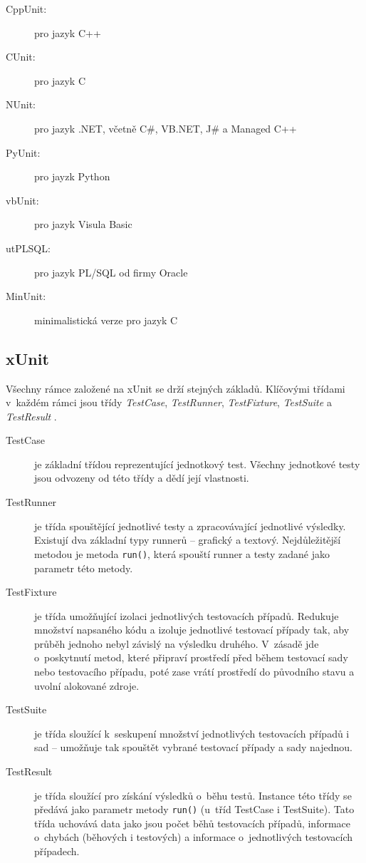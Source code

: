   \begin{description}
   \item[CppUnit:] pro jazyk C++
   \item[CUnit:] pro jazyk C
   \item[NUnit:] pro jazyk .NET, včetně C\#, VB.NET, J\# a Managed C++
   \item[PyUnit:] pro jayzk Python
   \item[vbUnit:] pro jazyk Visula Basic
   \item[utPLSQL:] pro jazyk PL/SQL od firmy Oracle
   \item[MinUnit:] minimalistická verze pro jazyk C
  \end{description}


    \subsection{xUnit}
    Všechny rámce založené na xUnit se drží stejných základů. Klíčovými třídami v~každém rámci jsou třídy \emph{TestCase}, \emph{TestRunner}, \emph{TestFixture}, \emph{TestSuite} a \emph{TestResult} \cite{UnitTestFrameworks}.

    \begin{description}
      \item[TestCase] je základní třídou reprezentující jednotkový test. Všechny jednotkové testy jsou odvozeny od této třídy a dědí její vlastnosti.
      \item[TestRunner] je třída spouštějící jednotlivé testy a zpracovávající jednotlivé výsledky. Existují dva základní typy runnerů -- grafický a textový. Nejdůležitější metodou je metoda \texttt{run()}, která spouští runner a testy zadané jako parametr této metody.
      \item[TestFixture] je třída umožňující izolaci jednotlivých testovacích případů. Redukuje množství napsaného kódu a izoluje jednotlivé testovací případy tak, aby průběh jednoho nebyl závislý na výsledku druhého. V~zásadě jde o~poskytnutí metod, které připraví prostředí před během testovací sady nebo testovacího případu, poté zase vrátí prostředí do původního stavu a uvolní alokované zdroje.
      \item[TestSuite] je třída sloužící k~seskupení množství jednotlivých testovacích případů i sad -- umožňuje tak spouštět vybrané testovací případy a sady najednou.
      \item[TestResult] je třída sloužící pro získání výsledků o~běhu testů. Instance této třídy se předává jako parametr metody \texttt{run()} (u~tříd TestCase i TestSuite). Tato třída uchovává data jako jsou počet běhů testovacích případů, informace o~chybách (běhových i testových) a informace o~jednotlivých testovacích případech.
    \end{description}


